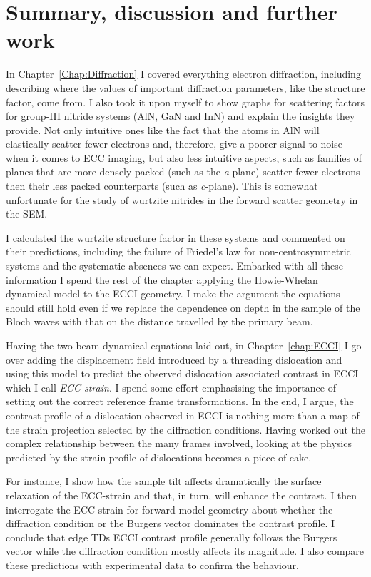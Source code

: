 \chapter{Summary, discussion and further work}
\label{chap:Conclusion}




In Chapter~\ref{Chap:Diffraction} I covered  everything electron diffraction, including describing where the values of important diffraction parameters, like the structure factor, come from.  I also took it upon myself to show graphs for scattering factors for group-III nitride systems (AlN, GaN and InN) and explain the insights they provide. Not only intuitive ones like the fact that the atoms in AlN will elastically scatter fewer electrons and, therefore, give a poorer signal to noise when it comes to ECC imaging, but also less intuitive aspects, such as families of planes that are more densely packed (such as the \textit{a}-plane) scatter fewer electrons then their less packed counterparts (such as \textit{c}-plane). This is somewhat unfortunate for the study of \hkl[001] wurtzite nitrides in the forward scatter geometry in the SEM. 

I calculated the wurtzite structure factor in these systems and commented on their predictions, including the failure of Friedel's law for non-centrosymmetric systems and the systematic absences we can expect. Embarked with all these information I spend the rest of the chapter applying the Howie-Whelan dynamical model to the ECCI geometry. I make the argument the equations should still hold even if we replace the dependence on depth in the sample of the Bloch waves with that on the distance travelled by the primary beam.  

Having the two beam dynamical equations laid out, in Chapter~\ref{chap:ECCI} I go over adding the displacement field introduced by a threading dislocation and using this model to predict the observed dislocation associated contrast in ECCI which I call \textit{ECC-strain}. I spend some effort emphasising the importance of setting out the correct reference frame transformations. In the  end, I argue, the contrast profile of a dislocation observed in ECCI is nothing more than a map of the strain projection selected by the diffraction conditions. Having worked out the complex relationship between the many frames involved, looking at the physics predicted by the strain profile of dislocations becomes a piece of cake.  

For instance, I show how the sample tilt affects dramatically the surface relaxation of the ECC-strain and that, in turn, will enhance the contrast. I then interrogate the ECC-strain for forward model geometry about whether the diffraction condition or the Burgers vector dominates the contrast profile. I conclude that edge TDs ECCI contrast profile generally follows the Burgers vector while the diffraction condition mostly affects its magnitude. I also compare these predictions with   experimental data to confirm the behaviour.


